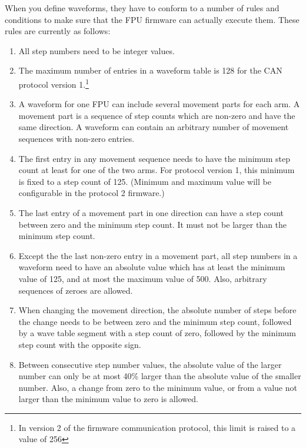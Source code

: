 \documentclass{scrartcl}[12pt,a4paper]
\begin{document}
When you define waveforms, they have to conform to a number of rules
and conditions to make sure that the FPU firmware can actually execute
them. These rules are currently as follows:

\begin{enumerate}

\item All step numbers need to be integer values.

\item The maximum number of entries in a waveform table is 128 for the
  CAN protocol version 1.\footnote{In version 2 of the firmware
    communication protocol, this limit is raised to a value of 256}
  
\item A waveform for one FPU can include several movement parts for
  each arm. A movement part is a sequence of step counts which are
  non-zero and have the same direction.  A waveform can contain an
  arbitrary number of movement sequences with non-zero entries.

\item The first entry in any movement sequence needs to have the
  minimum step count at least for one of the two arms.  For protocol
  version 1, this minimum is fixed to a step count of 125. (Minimum
  and maximum value will be configurable in the protocol 2 firmware.)

\item The last entry of a movement part in one direction can have a
  step count between zero and the minimum step count. It must not be
  larger than the minimum step count.
  
\item Except the the last non-zero entry in a movement part, all step
  numbers in a waveform need to have an absolute value which has at
  least the minimum value of 125, and at most the maximum value of
  500. Also, arbitrary sequences of zeroes are allowed.

\item When changing the movement direction, the absolute number of
  steps before the change needs to be between zero and the minimum
  step count, followed by a wave table segment with a step count of
  zero, followed by the minimum step count with the opposite sign.

\item Between consecutive step number values, the absolute value of
  the larger number can only be at most 40\% larger than the absolute
  value of the smaller number. Also, a change from zero to the minimum
  value, or from a value not larger than the minimum value to zero is
  allowed.

  
\end{enumerate}
\end{document}
